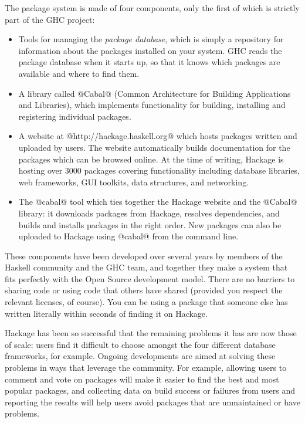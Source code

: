 \documentclass{article}
\begin{document}
{The package system is made of four components, only the first of which
is strictly part of the GHC project:

\begin{itemize}
\item Tools for managing the \emph{package database}, which is simply
  a repository for information about the packages installed on your
  system.  GHC reads the package database when it starts up, so that
  it knows which packages are available and where to find them.

\item A library called @Cabal@ (Common Architecture for Building
  Applications and Libraries), which implements functionality for
  building, installing and registering individual packages.

\item A website at @http://hackage.haskell.org@ which hosts packages
  written and uploaded by users.  The website automatically builds
  documentation for the packages which can be browsed online.  At the
  time of writing, Hackage is hosting over 3000 packages covering
  functionality including database libraries, web frameworks, GUI
  toolkits, data structures, and networking.

\item The @cabal@ tool which ties together the Hackage website and the
  @Cabal@ library: it downloads packages from Hackage, resolves
  dependencies, and builds and installs packages in the right order.
  New packages can also be uploaded to Hackage using @cabal@ from the
  command line.
\end{itemize}

These components have been developed over several years by members of
the Haskell community and the GHC team, and together they make a
system that fits perfectly with the Open Source development model.
There are no barriers to sharing code or using code that others have
shared (provided you respect the relevant licenses, of course).  You
can be using a package that someone else has written literally within
seconds of finding it on Hackage.

Hackage has been so successful that the remaining problems it has are
now those of scale: users find it difficult to choose amongst the four
different database frameworks, for example.  Ongoing developments are aimed
at solving these problems in ways that leverage the community.  For
example, allowing users to comment and vote on packages will make it
easier to find the best and most popular packages, and collecting data
on build success or failures from users and reporting the results will
help users avoid packages that are unmaintained or have problems.

}
\end{document}
